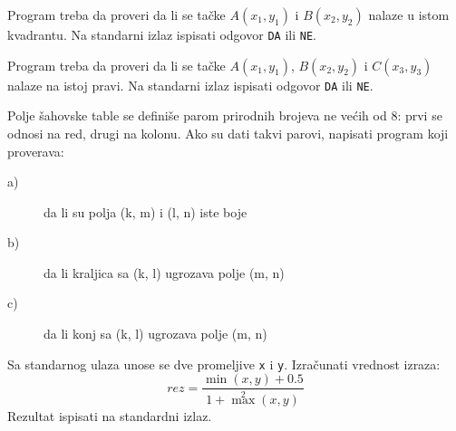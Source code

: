 \begin{Exercise}[label=p1_19]
Program treba da proveri da li se ta\v cke $A(x_1, y_1)$ i $B(x_2,
y_2)$ nalaze u istom kvadrantu. Na standarni izlaz ispisati odgovor
\verb|DA| ili \verb|NE|. \\
\end{Exercise}
\begin{Answer}[ref=p1_19]
\end{Answer}

\begin{Exercise}[label=p1_20]
Program treba da proveri da li se ta\v cke $A(x_1, y_1)$, $B(x_2,
y_2)$ i $C(x_3, y_3)$ nalaze na istoj pravi. Na standarni izlaz
ispisati odgovor \verb|DA| ili \verb|NE|. \\
\end{Exercise}
\begin{Answer}[ref=p1_20]
\end{Answer}

\begin{Exercise}[label=p1_21]
Polje \v sahovske table se defini\v se parom prirodnih brojeva ne ve\'
cih od 8: prvi se odnosi na red, drugi na kolonu. Ako su dati takvi
parovi, napisati program koji proverava: \\
\begin{description}
\item[a)] da li su polja (k, m) i (l, n) iste boje
\item[b)] da li kraljica sa (k, l) ugrozava polje (m, n)
\item[c)] da li konj sa (k, l) ugrozava polje (m, n)
\end{description}
\end{Exercise}
\begin{Answer}[ref=p1_21]
\end{Answer}


\begin{Exercise}[label=p1_22]
Sa standarnog ulaza unose se dve promeljive \verb|x| i
\verb|y|. Izra\v cunati vrednost izraza:
 $$rez = \frac{\min(x, y) + 0.5}{1 + \max^2(x, y)}$$
Rezultat ispisati na standardni izlaz. \\
\end{Exercise}
\begin{Answer}[ref=p1_22]
\end{Answer}

